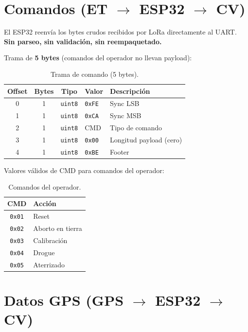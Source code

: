 \documentclass[11pt,a4paper]{article}
\begin{document}
\section{Comandos (ET $\rightarrow$ ESP32 $\rightarrow$ CV)}

El ESP32 reenvía los bytes crudos recibidos por LoRa directamente al UART. \textbf{Sin parseo, sin validación, sin reempaquetado.}

Trama de \textbf{5 bytes} (comandos del operador no llevan payload):

\begin{table}[h]
\centering
\begin{tabular}{@{}cccll@{}}
\toprule
\textbf{Offset} & \textbf{Bytes} & \textbf{Tipo} & \textbf{Valor} & \textbf{Descripción} \\
\midrule
0 & 1 & \texttt{uint8} & \texttt{0xFE} & Sync LSB \\
1 & 1 & \texttt{uint8} & \texttt{0xCA} & Sync MSB \\
2 & 1 & \texttt{uint8} & CMD            & Tipo de comando \\
3 & 1 & \texttt{uint8} & \texttt{0x00}  & Longitud payload (cero) \\
4 & 1 & \texttt{uint8} & \texttt{0xBE}  & Footer \\
\bottomrule
\end{tabular}
\caption{Trama de comando (5 bytes).}
\end{table}

Valores válidos de CMD para comandos del operador:

\begin{table}[h]
\centering
\begin{tabular}{@{}cl@{}}
\toprule
\textbf{CMD} & \textbf{Acción} \\
\midrule
\texttt{0x01} & Reset \\
\texttt{0x02} & Aborto en tierra \\
\texttt{0x03} & Calibración \\
\texttt{0x04} & Drogue \\
\texttt{0x05} & Aterrizado \\
\bottomrule
\end{tabular}
\caption{Comandos del operador.}
\end{table}


\section{Datos GPS (GPS $\rightarrow$ ESP32 $\rightarrow$ CV)}
\end{document}

